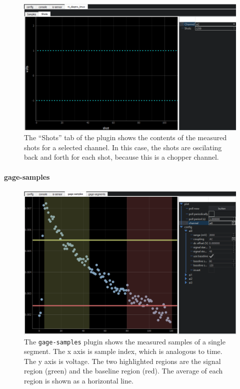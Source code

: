\begin{landscape}
\begin{figure}
\includegraphics[width=8in]{"yaq/images/ni_daq_shots"}
\caption[\yaqcqtpy{} NI DAQmx Tmux Plugin (shots)]{
	The ``Shots'' tab of the  plugin shows the contents of the measured shots for a selected channel.
	In this case, the shots are oscilating back and forth for each shot, because this is a chopper channel.
}
\label{yaq:fig:ni_daq_shots}
\end{figure}
\end{landscape}


\paragraph{gage-samples}

\begin{landscape}
\begin{figure}
\includegraphics[width=8in]{"yaq/images/gage_samples_ai0"}
\caption[\yaqcqtpy{} Gage DAQ Plugin (samples)]{
	The \texttt{gage-samples} plugin shows the measured samples of a single segment.
	The x axis is sample index, which is analogous to time.
	The y axis is voltage.
	The two highlighted regions are the signal region (green) and the baseline region (red).
	The average of each region is shown as a horizontal line.
}
\label{yaq:fig:gage_samples_ai0}
\end{figure}
\end{landscape}



